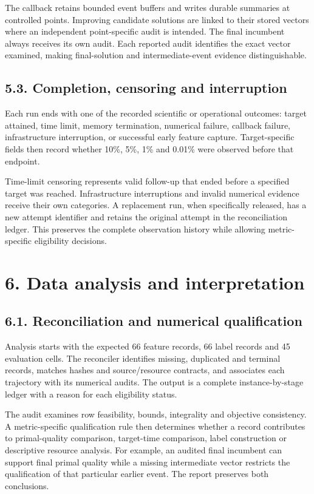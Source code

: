 \documentclass[
  british,
  10pt,
]{article}
\begin{document}
The callback retains bounded event buffers and writes durable summaries
at controlled points. Improving candidate solutions are linked to their
stored vectors where an independent point-specific audit is intended.
The final incumbent always receives its own audit. Each reported audit
identifies the exact vector examined, making final-solution and
intermediate-event evidence distinguishable.

\subsection{5.3. Completion, censoring and
interruption}\label{completion-censoring-and-interruption}

Each run ends with one of the recorded scientific or operational
outcomes: target attained, time limit, memory termination, numerical
failure, callback failure, infrastructure interruption, or successful
early feature capture. Target-specific fields then record whether 10\%,
5\%, 1\% and 0.01\% were observed before that endpoint.

Time-limit censoring represents valid follow-up that ended before a
specified target was reached. Infrastructure interruptions and invalid
numerical evidence receive their own categories. A replacement run, when
specifically released, has a new attempt identifier and retains the
original attempt in the reconciliation ledger. This preserves the
complete observation history while allowing metric-specific eligibility
decisions.

\section{6. Data analysis and
interpretation}\label{data-analysis-and-interpretation}

\subsection{6.1. Reconciliation and numerical
qualification}\label{reconciliation-and-numerical-qualification}

Analysis starts with the expected 66 feature records, 66 label records
and 45 evaluation cells. The reconciler identifies missing, duplicated
and terminal records, matches hashes and source/resource contracts, and
associates each trajectory with its numerical audits. The output is a
complete instance-by-stage ledger with a reason for each eligibility
status.

The audit examines row feasibility, bounds, integrality and objective
consistency. A metric-specific qualification rule then determines
whether a record contributes to primal-quality comparison, target-time
comparison, label construction or descriptive resource analysis. For
example, an audited final incumbent can support final primal quality
while a missing intermediate vector restricts the qualification of that
particular earlier event. The report preserves both conclusions.
\end{document}

